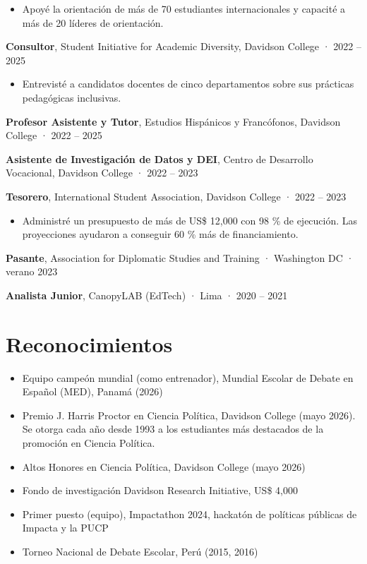 \documentclass[10pt,a4paper]{article}
\begin{document}
\begin{itemize}
\item Apoyé la orientación de más de 70 estudiantes internacionales y capacité a más de 20 líderes de orientación.
\end{itemize}
\smallskip
\textbf{Consultor}, Student Initiative for Academic Diversity, Davidson College · 2022 – 2025\par
\begin{itemize}
\item Entrevisté a candidatos docentes de cinco departamentos sobre sus prácticas pedagógicas inclusivas.
\end{itemize}
\smallskip
\textbf{Profesor Asistente y Tutor}, Estudios Hispánicos y Francófonos, Davidson College · 2022 – 2025\par
\smallskip
\textbf{Asistente de Investigación de Datos y DEI}, Centro de Desarrollo Vocacional, Davidson College · 2022 – 2023\par
\smallskip
\textbf{Tesorero}, International Student Association, Davidson College · 2022 – 2023\par
\begin{itemize}
\item Administré un presupuesto de más de US\$ 12,000 con 98 \% de ejecución. Las proyecciones ayudaron a conseguir 60 \% más de financiamiento.
\end{itemize}
\smallskip
\textbf{Pasante}, Association for Diplomatic Studies and Training · Washington DC · verano 2023\par
\smallskip
\textbf{Analista Junior}, CanopyLAB (EdTech) · Lima · 2020 – 2021\par
\section*{Reconocimientos}
\begin{itemize}
\item Equipo campeón mundial (como entrenador), Mundial Escolar de Debate en Español (MED), Panamá (2026)
\item Premio J. Harris Proctor en Ciencia Política, Davidson College (mayo 2026). Se otorga cada año desde 1993 a los estudiantes más destacados de la promoción en Ciencia Política.
\item Altos Honores en Ciencia Política, Davidson College (mayo 2026)
\item Fondo de investigación Davidson Research Initiative, US\$ 4,000
\item Primer puesto (equipo), Impactathon 2024, hackatón de políticas públicas de Impacta y la PUCP
\item Torneo Nacional de Debate Escolar, Perú (2015, 2016)
\end{itemize}
\end{document}
